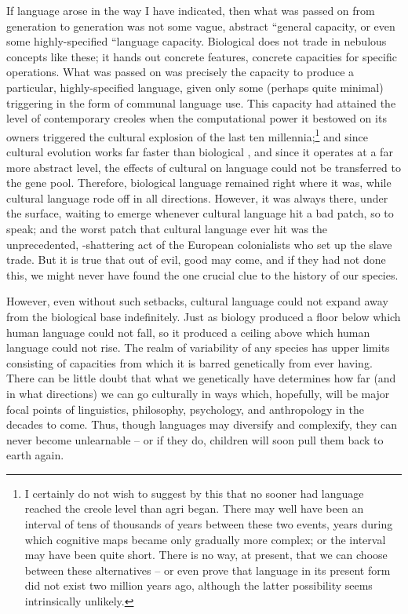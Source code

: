 If language arose in the way I have indicated, then what was passed on from generation to generation was not some vague, abstract ``general  capacity, or even some highly-specified ``language
 capacity. Biological  does not trade in nebulous concepts like these; it hands out concrete features, concrete capacities for specific operations. What was passed on was precisely the capacity to produce a particular, highly-specified language, given only some (perhaps quite minimal) triggering in the form of communal language use. This capacity had attained the level of contemporary creoles when the computational power it bestowed on its owners triggered the cultural explosion of the last ten millennia;\footnote{I certainly do not wish to suggest by this that no sooner had language reached the creole level than agri began. There may well have been an interval of tens of thousands of years between these two events, years during which cognitive maps became only gradually more complex; or the interval may have been quite short. There is no way, at present, that we can choose between these alternatives -- or even prove that language in its present form did not exist two million years ago, although the latter possibility seems intrinsically unlikely.} and since cultural evolu\-tion works far faster than biological , and since it operates at a far more abstract level, the effects of cultural  on language could not be transferred to the gene pool. Therefore, biological language remained right where it was, while cultural language rode off in all directions. However, it was always there, under the surface, waiting to emerge whenever cultural language hit a bad patch, so to speak; and the worst patch that cultural language ever hit was the unprecedented, -shattering act of the European colonialists who set up the slave trade. But it is true that out of evil, good may come, and if they had not done this, we might never have found the one crucial clue to the history of our species.

However, even without such setbacks, cultural language could not expand away from the biological base indefinitely. Just as biology produced a floor below which human language could not fall, so it produced a ceiling above which human language could not rise. The realm of variability of any species has upper limits consisting of capa\-cities from which it is barred genetically from ever having. There can be little doubt that what we genetically have determines how far (and in what directions) we can go culturally in ways which, hopefully, will be major focal points of linguistics, philosophy, psychology, and anthropology in the decades to come. Thus, though languages may diversify and complexify, they can never become unlearnable -- or if they do, children will soon pull them back to earth again.

